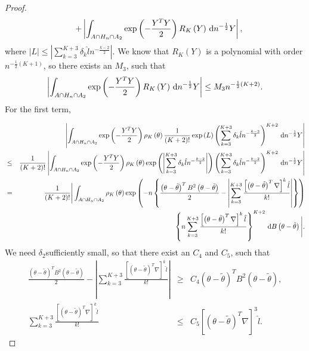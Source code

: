 \begin{proof}
\begin{eqnarray*}
 &  & +\left|\int_{A\cap H_{n}\cap A_{2}}\exp\left(-\frac{Y^{T}Y}{2}\right)R_{K}\left(Y\right)\,\mathrm{d} n^{-\frac{1}{2}}Y\right|,
\end{eqnarray*}
where $\left|L\right|\le\left|\sum_{k=3}^{K+3}\delta_{k}\hat{l}n^{-\frac{k-2}{2}}\right|$.
We know that $R_{K}\left(Y\right)$ is a polynomial with order $n^{-\frac{1}{2}\left(K+1\right)}$,
so there exists an $M_{3}$, such that 
\[
\left|\int_{A\cap H_{n}\cap A_{2}}\exp\left(-\frac{Y^{T}Y}{2}\right)R_{K}\left(Y\right)\,\mathrm{d} n^{-\frac{1}{2}}Y\right|\le M_{3}n^{-\frac{1}{2}\left(K+2\right)}.
\]
For the first term, 

\begin{eqnarray}
 &  & \left|\int_{A\cap H_{n}\cap A_{2}}\exp\left(-\frac{Y^{T}Y}{2}\right)\rho_{K}\left(\theta\right)\frac{1}{\left(K+2\right)!}\exp\left(L\right)\left(\sum_{k=3}^{K+3}\delta_{k}\hat{l}n^{-\frac{k-2}{2}}\right)^{K+2}\,\mathrm{d} n^{-\frac{1}{2}}Y\right|\label{eq:1}\\
 & \le & \frac{1}{\left(K+2\right)!}\left|\int_{A\cap H_{n}\cap A_{2}}\exp\left(-\frac{Y^{T}Y}{2}\right)\rho_{K}\left(\theta\right)\exp\left(\left|\sum_{k=3}^{K+3}\delta_{k}\hat{l}n^{-\frac{k-2}{2}}\right|\right)\left(\sum_{k=3}^{K+3}\delta_{k}\hat{l}n^{-\frac{k-2}{2}}\right)^{K+2}\,\mathrm{d} n^{-\frac{1}{2}}Y\right|\nonumber \\
 & = & \frac{1}{\left(K+2\right)!}\Bigg|\int_{A\cap H_{n}\cap A_{2}}\rho_{K}\left(\theta\right)\exp\left(-n\left\{ \frac{\left(\theta-\tilde{\theta}\right)^{T}B^{2}\left(\theta-\tilde{\theta}\right)}{2}-\left|\sum_{k=3}^{K+3}\frac{\left[\left(\theta-\tilde{\theta}\right)^{T}\nabla\right]^{k}\hat{l}}{k!}\right|\right\} \right)\nonumber \\
 &  & \left\{ n\sum_{k=3}^{K+3}\frac{\left[\left(\theta-\tilde{\theta}\right)^{T}\nabla\right]^{k}\hat{l}}{k!}\right\} ^{K+2}\,\mathrm{d} B\left(\theta-\tilde{\theta}\right)\Bigg|.\nonumber 
\end{eqnarray}
We need $\delta_{2}$sufficiently small, so that there exist an $C_{4}$
and $C_{5}$, such that 
\begin{eqnarray*}
\frac{\left(\theta-\tilde{\theta}\right)^{T}B^{2}\left(\theta-\tilde{\theta}\right)}{2}-\left|\sum_{k=3}^{K+3}\frac{\left[\left(\theta-\tilde{\theta}\right)^{T}\nabla\right]^{k}\hat{l}}{k!}\right| & \ge & C_{4}\left(\theta-\tilde{\theta}\right)^{T}B^{2}\left(\theta-\tilde{\theta}\right),\\
\sum_{k=3}^{K+3}\frac{\left[\left(\theta-\tilde{\theta}\right)^{T}\nabla\right]^{k}\hat{l}}{k!} & \le & C_{5}\left[\left(\theta-\tilde{\theta}\right)^{T}\nabla\right]^{3}\hat{l}.

\end{eqnarray*}
\end{proof}

